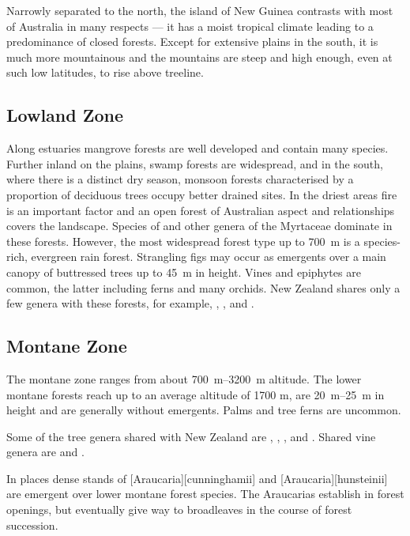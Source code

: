 Narrowly separated to the north, the island of New Guinea contrasts with most of Australia in many respects --- it has a moist tropical climate leading to a predominance of closed forests.
Except for extensive plains in the south, it is much more mountainous and the mountains are steep and high enough, even at such low latitudes, to rise above treeline.

\subsection{Lowland Zone}

Along estuaries mangrove forests are well developed and contain many species.
Further inland on the plains, swamp forests are widespread, and in the south, where there is a distinct dry season, monsoon forests characterised by a proportion of deciduous trees occupy better drained sites.
In the driest areas fire is an important factor and an open forest of Australian aspect and relationships covers the landscape.
Species of  and other genera of the Myrtaceae dominate in these forests.
However, the most widespread forest type up to \SI{700}{\metre} is a species-rich, evergreen rain forest.
Strangling figs may occur as emergents over a main canopy of buttressed trees up to \SI{45}{\metre} in height.
Vines and epiphytes are common, the latter including ferns and many orchids.
New Zealand shares only a few genera with these forests, for example, , ,  and .

\subsection{Montane Zone}

The montane zone ranges from about \SIrange{700}{3200}{\metre} altitude.
The lower montane forests reach up to an average altitude of 1700 m, are \SIrange{20}{25}{\metre} in height and are generally without emergents.
Palms and tree ferns are uncommon.

Some of the tree genera shared with New Zealand are , , ,  and .
Shared vine genera are  and .

In places dense stands of [Araucaria][cunninghamii] and [Araucaria][hunsteinii] are emergent over lower montane forest species.
The Araucarias establish in forest openings, but eventually give way to broadleaves in the course of forest succession.

